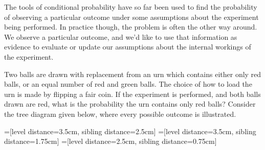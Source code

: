 The tools of conditional probability have so far been used to find the probability of observing a particular outcome under some assumptions about the experiment being performed. In practice though, the problem is often the other way around. We observe a particular outcome, and we'd like to use that information as evidence to evaluate or update our assumptions about the internal workings of the experiment.
\begin{examp}\label{BayesUrn}
Two balls are drawn with replacement from an urn which contains either only red balls, or an equal number of red and green balls. The choice of how to load the urn is made by flipping a fair coin. If the experiment is performed, and both balls drawn are red, what is the probability the urn contains only red balls?
\noindent Consider the tree diagram given below, where every possible outcome is illustrated.
\begin{center}
=[level distance=3.5cm, sibling distance=2.5cm]
=[level distance=3.5cm, sibling distance=1.75cm]
=[level distance=2.5cm, sibling distance=0.75cm]
\end{center}
\end{examp}
